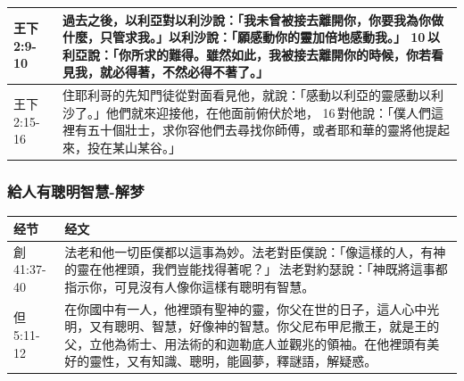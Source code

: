 \begin{table}[H]
\begin{tabular}{p{6em}p{40em}}
王下2:9-10&過去之後，以利亞對以利沙說：「我未曾被接去離開你，你要我為你做什麼，只管求我。」以利沙說：「願感動你的靈加倍地感動我。」 10 以利亞說：「你所求的難得。雖然如此，我被接去離開你的時候，你若看見我，就必得著，不然必得不著了。」\\  \midrule
王下2:15-16&住耶利哥的先知門徒從對面看見他，就說：「感動以利亞的靈感動以利沙了。」他們就來迎接他，在他面前俯伏於地， 16 對他說：「僕人們這裡有五十個壯士，求你容他們去尋找你師傅，或者耶和華的靈將他提起來，投在某山某谷。」\\  \midrule
\end{tabular}
\end{table}


\subsubsection{給人有聰明智慧-解梦}
\begin{table}[H]
\centering
\begin{tabular}{p{6em}p{42em}}  \toprule
经节&经文 \\  \midrule
創41:37-40&法老和他一切臣僕都以這事為妙。法老對臣僕說：「像這樣的人，有神的靈在他裡頭，我們豈能找得著呢？」 法老對約瑟說：「神既將這事都指示你，可見沒有人像你這樣有聰明有智慧。 \\  \midrule%
但5:11-12&在你國中有一人，他裡頭有聖神的靈，你父在世的日子，這人心中光明，又有聰明、智慧，好像神的智慧。你父尼布甲尼撒王，就是王的父，立他為術士、用法術的和迦勒底人並觀兆的領袖。在他裡頭有美好的靈性，又有知識、聰明，能圓夢，釋謎語，解疑惑。\\  \midrule%
\end{tabular}
\end{table}



